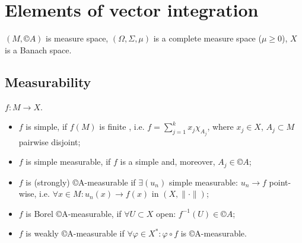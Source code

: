 \documentclass[12pt]{article}					%
\begin{document}
\section{Elements of vector integration}
\begin{poznamka}
	$(M, ©A)$ is measure space, $(Ω, Σ, μ)$ is a complete measure space ($μ≥0$), $X$ is a Banach space.
\end{poznamka}

\subsection{Measurability}
\begin{definice}
	$f: M \rightarrow X$.

	\begin{itemize}
		\item $f$ is simple, if $f(M)$ is finite , i.e. $f = \sum_{j=1}^k x_j χ_{A_j}$, where $x_j \in X$, $A_j \subset M$ pairwise disjoint;
		\item $f$ is simple measurable, if $f$ is a simple and, moreover, $A_j \in ©A$;
		\item $f$ is (strongly) ©A-measurable if $\exists (u_n)$ simple measurable: $u_n \rightarrow f$ point-wise, i.e. $\forall x \in M: u_n(x) \rightarrow f(x)$ in $(X, \|·\|)$;
		\item $f$ is Borel ©A-measurable, if $\forall U \subset X$ open: $f^{-1}(U) \in ©A$;
		\item $f$ is weakly ©A-measurable if $\forall φ \in X^*: φ ∘ f$ is ©A-measurable.
	\end{itemize}
\end{definice}
\end{document}
